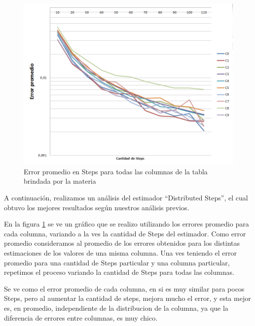 \begin{figure}[H]
	    \includegraphics[scale=.60]{imagenes/variacion_parametro_y_columna_steps.png}
	    \caption{Error promedio en Steps para todas las columnas de la tabla brindada por la materia} 
	    \label{fig:variacion_parametro_y_columna_steps}
\end{figure}

	A continuaci\'on, realizamos un an\'alisis del estimador ``Distributed Steps'', el cual obtuvo los mejores resultados seg\'un nuestros an\'alisis previos.
	
	En la figura \ref{fig:variacion_parametro_y_columna_steps} se ve un gr\'afico que se realizo utilizando los errores promedio para cada columna, variando a la ves la cantidad de Steps del estimador. Como error promedio consideramos al promedio de los errores obtenidos para los distintas estimaciones de los valores de una misma columna. Una ves teniendo el error promedio para una cantidad de Steps particular y una columna particular, repetimos el proceso variando la cantidad de Steps para todas las columnas.
	
	Se ve como el error promedio de cada columna, en si es muy similar para pocos Steps, pero al aumentar la cantidad de steps, mejora mucho el error, y esta mejor es, en promedio, independiente de la distribucion de la columna, ya que la diferencia de errores entre columnas, es muy chico.

